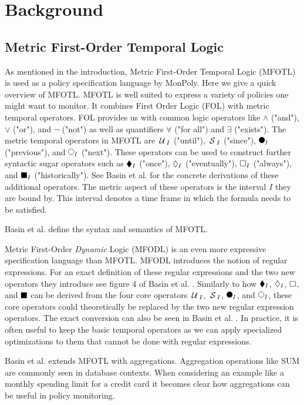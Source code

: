 \chapter{Background}

\section{Metric First-Order Temporal Logic}
As mentioned in the introduction, Metric First-Order Temporal Logic (MFOTL) \cite{Basin2008, Basin2015, Chomicki1995} is used as a policy specification language by MonPoly.
Here we give a quick overview of MFOTL.
MFOTL is well suited to express a variety of policies one might want to monitor.
It combines First Order Logic (FOL) with metric temporal operators.
FOL provides us with common logic operators like $\land$ ("and"), $\lor$ ("or"), and $\neg$ ("not") as well as quantifiers $\forall$ ("for all") and $\exists$ ("exists").
The metric temporal operators in MFOTL are $\,\mathcal{U}\,_I$ ("until"), $\,\mathcal{S}\,_I$ ("since"), $\Previous_I$ ("previous"), and $\Next_I$ ("next").
These operators can be used to construct further syntactic sugar operators such as $\blacklozenge_I$ ("once"), $\lozenge_I$ ("eventually"), $\square_I$ ("always"), and $\blacksquare_I$ ("historically").
See Basin et al. \cite{Basin2015} for the concrete derivations of these additional operators.
The metric aspect of these operators is the interval $I$ they are bound by.
This interval denotes a time frame in which the formula needs to be satisfied.

Basin et al. \cite{Basin2008} define the syntax and semantics of MFOTL.


Metric First-Order \textit{Dynamic} Logic (MFODL) \cite{Basin2020} is an even more expressive specification language than MFOTL.
MFODL introduces the notion of regular expressions.
For an exact definition of these regular expressions and the two new operators they introduce see figure 4 of Basin et al. \cite{Basin2020}.
Similarly to how $\blacklozenge_I$, $\lozenge_I$, $\square$, and $\blacksquare$ can be derived from the four core operators $\,\mathcal{U}\,_I$, $\,\mathcal{S}\,_I$, $\Previous_I$, and $\Next_I$, these core operators could theoretically be replaced by the two new regular expression operators.
The exact conversion can also be seen in Basin et al. \cite{Basin2020}.
In practice, it is often useful to keep the basic temporal operators as we can apply specialized optimizations to them that cannot be done with regular expressions.

Basin et al. \cite{Basin2015aggregations} extends MFOTL with aggregations.
Aggregation operations like SUM are commonly seen in database contexts.
When considering an example like a monthly spending limit for a credit card it becomes clear how aggregations can be useful in policy monitoring.


